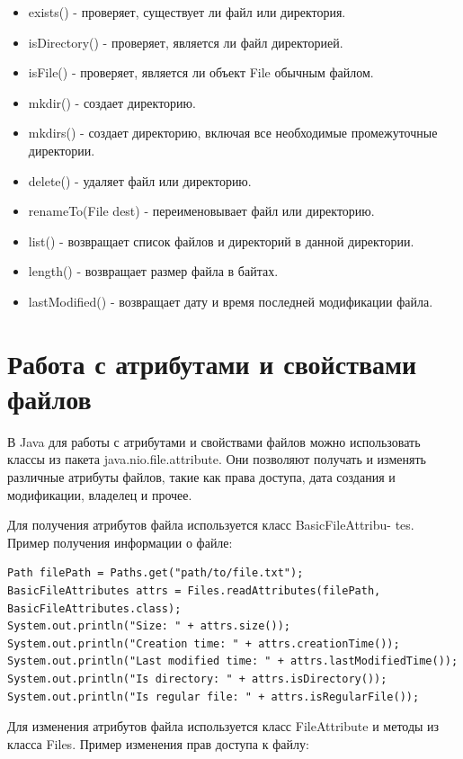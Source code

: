 \begin{itemize}
\item exists() - проверяет, существует ли файл или директория.
\item isDirectory() - проверяет, является ли файл директорией.
\item isFile() - проверяет, является ли объект File обычным файлом.
\item mkdir() - создает директорию.
\item mkdirs() - создает директорию, включая все необходимые промежуточные директории.
\item delete() - удаляет файл или директорию.
\item renameTo(File dest) - переименовывает файл или директорию.
\item list() - возвращает список файлов и директорий в данной директории.
\item length() - возвращает размер файла в байтах.
\item lastModified() - возвращает дату и время последней модификации файла.
\end{itemize}

\section{Работа с атрибутами и свойствами файлов}

В Java для работы с атрибутами и свойствами файлов можно использовать классы из пакета java.nio.file.attribute. Они позволяют получать и изменять различные атрибуты файлов, такие как права доступа, дата создания и модификации, владелец и прочее.

Для получения атрибутов файла используется класс BasicFileAttribu- \newline tes. Пример получения информации о файле:

\begin{lstlisting}
Path filePath = Paths.get("path/to/file.txt");
BasicFileAttributes attrs = Files.readAttributes(filePath, BasicFileAttributes.class);
System.out.println("Size: " + attrs.size());
System.out.println("Creation time: " + attrs.creationTime());
System.out.println("Last modified time: " + attrs.lastModifiedTime());
System.out.println("Is directory: " + attrs.isDirectory());
System.out.println("Is regular file: " + attrs.isRegularFile());
\end{lstlisting}

Для изменения атрибутов файла используется класс FileAttribute и методы из класса Files. Пример изменения прав доступа к файлу:

